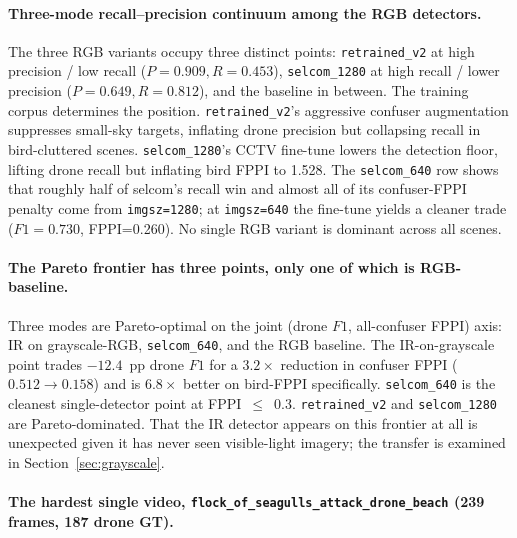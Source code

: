 \paragraph{Three-mode recall--precision continuum among the RGB detectors.}
The three RGB variants occupy three distinct points: \texttt{retrained\_v2} at high precision / low recall ($P=0.909, R=0.453$), \texttt{selcom\_1280} at high recall / lower precision ($P=0.649, R=0.812$), and the baseline in between. The training corpus determines the position. \texttt{retrained\_v2}'s aggressive confuser augmentation suppresses small-sky targets, inflating drone precision but collapsing recall in bird-cluttered scenes. \texttt{selcom\_1280}'s CCTV fine-tune lowers the detection floor, lifting drone recall but inflating bird FPPI to 1.528. The \texttt{selcom\_640} row shows that roughly half of selcom's recall win and almost all of its confuser-FPPI penalty come from \texttt{imgsz=1280}; at \texttt{imgsz=640} the fine-tune yields a cleaner trade ($F1=0.730$, FPPI=0.260). No single RGB variant is dominant across all scenes.

\paragraph{The Pareto frontier has three points, only one of which is RGB-baseline.}
Three modes are Pareto-optimal on the joint (drone $F1$, all-confuser FPPI) axis: IR on grayscale-RGB, \texttt{selcom\_640}, and the RGB baseline. The IR-on-grayscale point trades $-12.4$~pp drone $F1$ for a $3.2\times$ reduction in confuser FPPI ($0.512 \to 0.158$) and is $6.8\times$ better on bird-FPPI specifically. \texttt{selcom\_640} is the cleanest single-detector point at FPPI~$\leq$~0.3. \texttt{retrained\_v2} and \texttt{selcom\_1280} are Pareto-dominated. That the IR detector appears on this frontier at all is unexpected given it has never seen visible-light imagery; the transfer is examined in Section~\ref{sec:grayscale}.

\paragraph{The hardest single video, \texttt{flock\_of\_seagulls\_attack\_drone\_beach} (239 frames, 187 drone GT).}

